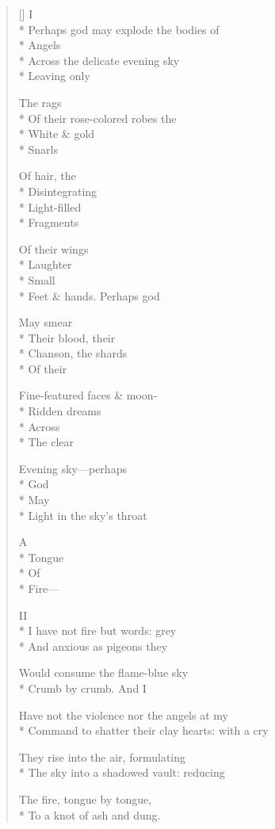 \label{ch:a_fragment}
\settowidth{\versewidth}{                                               Ridden dreams}
\begin{verse}[\versewidth]
                                  I\\*
Perhaps god may explode the bodies of\\*
Angels\\*
              Across the delicate evening sky\\*
                          Leaving only

The rags\\*
              Of their rose-colored robes the\\*
              White \& gold\\*
                                       Snarls

Of hair, the\\*
                    Disintegrating\\*
                                              Light-filled\\*
                                       Fragments

Of their wings\\*
                         Laughter\\*
                                        Small\\*
Feet \& hands.     Perhaps god

May smear\\*
                 Their blood, their\\*
Chanson, the shards\\*
                                  Of their

Fine-featured faces \& moon-\\*
                                               Ridden dreams\\*
Across\\*
        The clear

Evening sky---perhaps\\*
God\\*
        May\\*
Light in the sky's throat

A\\*
Tongue\\*
Of\\*
Fire---

                            II\\*
I have not fire but words: grey\\*
And anxious as pigeons      they

Would consume the flame-blue sky\\*
Crumb by crumb.     And I

Have not the violence nor the angels at my\\*
Command to shatter their clay hearts: with a cry

They rise into the air, formulating\\*
The sky into a shadowed vault: reducing

The fire, tongue by tongue,\\*
To a knot of ash and dung.
\end{verse}
